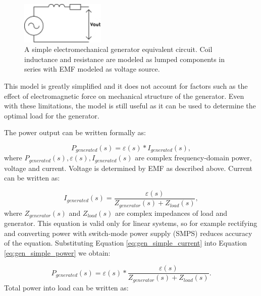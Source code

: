 \begin{figure}[htb]
\begin{center}
\includegraphics[height=2cm]{images/own_dwg/gen_simple}
\end{center}
\caption{A simple electromechanical generator equivalent circuit. Coil inductance and resistance are modeled as lumped components in series with EMF modeled as voltage source.}
\label{gen_simple}
\end{figure}

This model is greatly simplified and it does not account for factors such as the effect of electromagnetic force on mechanical structure of the generator. Even with these limitations, the model is still useful as it can be used to determine the optimal load for the generator. 

The power output can be written formally as:

\begin{equation} \label{eq:gen_simple_power}
  P_{generated}(s) = \varepsilon(s)*I_{generated}(s),
\end{equation}
where $P_{generated}(s), \varepsilon(s), I_{generated}(s)$ are complex frequency-domain power, voltage and current. Voltage is determined by EMF as described above. Current can be written as: 

\begin{equation} \label{eq:gen_simple_current}
  I_{generated}(s) = \frac{\varepsilon(s)}{Z_{generator}(s)+Z_{load}(s)},
\end{equation}
where $Z_{generator}(s) $ and $ Z_{load}(s)$ are complex impedances of load and generator. This equation is valid only for linear systems, so for example rectifying and converting power with switch-mode power supply (SMPS) reduces accuracy of the equation. Substituting Equation \eqref{eq:gen_simple_current} into Equation \eqref{eq:gen_simple_power} we obtain:

\begin{equation}
  P_{generated}(s) = \varepsilon(s)*\frac{\varepsilon(s)}{Z_{generator}(s)+Z_{load}(s)}.
\end{equation}
Total power into load can be written as:

